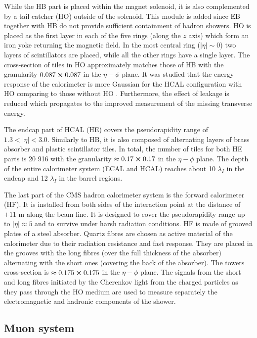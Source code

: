 While the HB part is placed within the magnet solenoid, it is also complemented by a tail catcher (HO) outside of the solenoid. This module is added since EB together with HB do not provide sufficient containment of hadron showers. HO is placed as the first layer in each of the five rings (along the $z$ axis) which form an iron yoke returning the magnetic field. In the most central ring ($|\eta| \sim 0$) two layers of scintillators are placed, while all the other rings have a single layer. The cross-section of tiles in HO approximately matches those of HB with the granularity $0.087 \cross 0.087$ in the $\eta-\phi$ plane. It was studied that the energy response of the calorimeter is more Gaussian for the HCAL configuration with HO comparing to those without HO \cite{Banerjee:1999dka}. Furthermore, the effect of leakage is reduced which propagates to the improved measurement of the missing transverse energy.

The endcap part of HCAL (HE) covers the pseudorapidity range of $1.3 < |\eta| < 3.0$. Similarly to HB, it is also composed of alternating layers of brass absorber and plastic scintillator tiles. In total, the number of tiles for both HE parts is 20 916 with the granularity $\approx 0.17 \cross 0.17$ in the $\eta-\phi$ plane. The depth of the entire calorimeter system (ECAL and HCAL) reaches about 10 $\lambda_I$ in the endcap and 12 $\lambda_I$ in the barrel regions.

The last part of the CMS hadron calorimeter system is the forward calorimeter (HF). It is installed from both sides of the interaction point at the distance of $\pm 11$ m along the beam line. It is designed to cover the pseudorapidity range up to $|\eta| \approx 5$ and to survive under harsh radiation conditions. HF is made of grooved plates of a steel absorber. Quartz fibres are chosen as active material of the calorimeter due to their radiation resistance and fast response. They are placed in the grooves with the long fibres (over the full thickness of the absorber) alternating with the short ones (covering the back of the absorber). The towers cross-section is $\approx 0.175 \cross 0.175$ in the $\eta-\phi$ plane. The signals from the short and long fibres initiated by the Cherenkov light from the charged particles as they pass through the HO medium are used to measure separately the electromagnetic and hadronic components of the shower.


\subsection{Muon system}\label{sec:muon-system}

